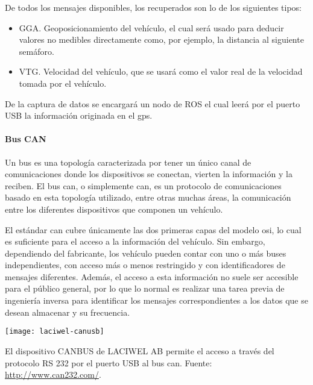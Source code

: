De todos los mensajes disponibles, los recuperados son lo de los siguientes tipos:

\begin{itemize}
	\item GGA. Geoposicionamiento del vehículo, el cual será usado para deducir valores no medibles directamente como, por ejemplo, la distancia al siguiente semáforo.
	\item VTG. Velocidad del vehículo, que se usará como el valor real de la velocidad tomada por el vehículo.
\end{itemize}

De la captura de datos se encargará un nodo de ROS  el cual leerá por el puerto USB la información originada en el \ac{gps}.

\paragraph{Bus CAN}

Un bus es una topología caracterizada por tener un único canal de comunicaciones donde los dispositivos se conectan, vierten la información y la reciben. El bus \acf{can}, o simplemente \ac{can}, es un protocolo de comunicaciones basado en esta topología utilizado, entre otras muchas áreas, la comunicación entre los diferentes dispositivos que componen un vehículo.

El estándar \ac{can} cubre únicamente las dos primeras capas del modelo \ac{osi}, lo cual es suficiente para el acceso a la información del vehículo. Sin embargo, dependiendo del fabricante, los vehículo pueden contar con uno o más buses independientes, con acceso más o menos restringido y con identificadores de mensajes diferentes. Además, el acceso a esta información no suele ser accesible para el público general, por lo que lo normal es realizar una tarea previa de ingeniería inversa para identificar los mensajes correspondientes a los datos que se desean almacenar y su frecuencia.

\begin{marginfigure}
	\centering
	\texttt{[image: laciwel-canusb]}
	\caption{El dispositivo CANBUS de LACIWEL AB permite el acceso a través del protocolo RS 232 por el puerto USB al bus \ac{can}. Fuente: \url{http://www.can232.com/}.}
	\label{fig:laciwel-canusb}
\end{marginfigure}

